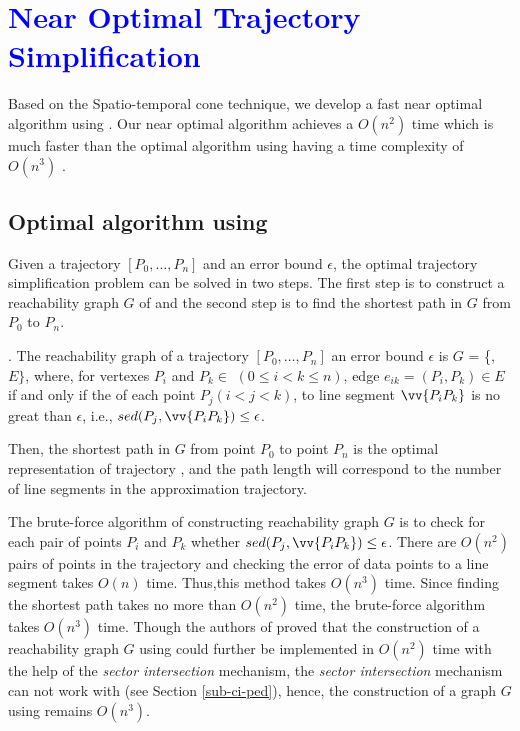 \section{\textcolor{blue}{Near Optimal Trajectory Simplification}}
\label{sec-optimal}

Based on the Spatio-temporal cone technique, we develop a fast near optimal algorithm using \sed. Our near optimal algorithm achieves a $O(n^2)$ time which is much faster than the optimal algorithm using \sed having a time complexity of $O(n^3)$ \cite{Imai:Optimal}.


\subsection{Optimal algorithm using \sed}

Given a trajectory ${[P_0, \ldots, P_n]}$ and an error bound $\epsilon$, the optimal trajectory simplification problem can be solved in two steps.
The first step is to construct a reachability graph $G$ of  and the second step is to find the shortest path in $G$ from $P_0$ to $P_{n}$.

. The reachability graph of a trajectory ${[P_0, \ldots, P_n]}$ \wrt an error bound $\epsilon$ is $G$
= \{, $E\}$, where, for vertexes $P_i$ and $P_k \in$  $(0 \le i<k\le n)$, edge $e_{ik}=(P_i, P_k) \in E$ if and only if the \sed of each point $P_j (i<j<k)$, to line segment $\vv{P_iP_k}$ is no great than $\epsilon$, i.e., $sed(P_j, \vv{P_iP_k}) \le \epsilon$.

Then, the shortest path in $G$ from point $P_0$ to point $P_{n}$ is the optimal representation of trajectory , and the path length will correspond to the number of line segments in the approximation trajectory. 


The brute-force algorithm of constructing reachability graph $G$ is to check for each pair of points $P_i$ and $P_k$ whether $sed(P_j, \vv{P_iP_k}) \le \epsilon$. 
There are $O(n^2)$ pairs of points in the trajectory and checking the error of data points to a line segment takes $O(n)$ time. 
Thus,this method takes $O(n^3)$ time. 
Since finding the shortest path takes no more than $O(n^2)$ time, the brute-force algorithm takes $O(n^3)$ time.
%
Though the authors of \cite{Chan:Optimal} proved that the construction of a reachability graph $G$ using \ped could further be implemented in $O(n^2)$ time with the help of the \textit{sector intersection} mechanism, the \textit{sector intersection} mechanism can not work with \sed (see Section \ref{sub-ci-ped}), hence, the construction of a graph  $G$ using \sed remains $O(n^3)$.

